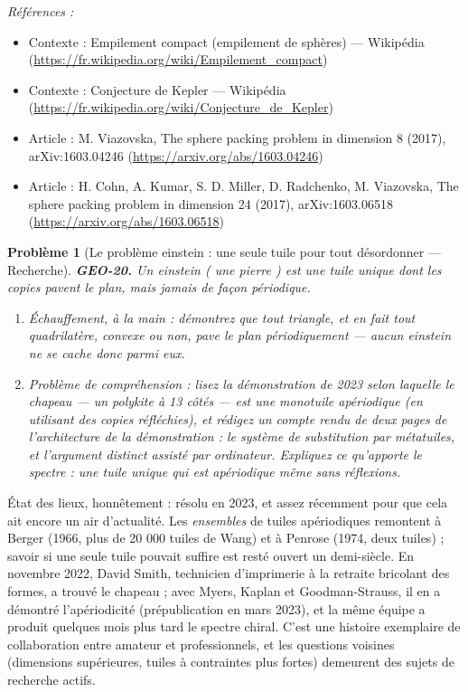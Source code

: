 \documentclass[11pt]{article}
\newtheorem{problem}{Problème}
\newenvironment{refs}{\par\small\noindent\emph{Références :}\begin{itemize}\setlength\itemsep{0pt}}{\end{itemize}\normalsize}
\begin{document}
\begin{refs}
\item Contexte : Empilement compact (empilement de sphères) --- Wikipédia (\url{https://fr.wikipedia.org/wiki/Empilement_compact})
\item Contexte : Conjecture de Kepler --- Wikipédia (\url{https://fr.wikipedia.org/wiki/Conjecture_de_Kepler})
\item Article : M. Viazovska, \og{} The sphere packing problem in dimension 8 \fg{} (2017), arXiv:1603.04246 (\url{https://arxiv.org/abs/1603.04246})
\item Article : H. Cohn, A. Kumar, S. D. Miller, D. Radchenko, M. Viazovska, \og{} The sphere packing problem in dimension 24 \fg{} (2017), arXiv:1603.06518 (\url{https://arxiv.org/abs/1603.06518})
\end{refs}

\bigskip

\begin{problem}[{Le problème einstein : une seule tuile pour tout désordonner --- Recherche}]
\textbf{GEO-20.} Un \textit{einstein} (\og{} une pierre \fg{}) est une tuile unique dont les copies pavent
le plan, mais jamais de façon périodique.
\begin{enumerate}
\item[(a)] Échauffement, à la main : démontrez que tout triangle, et en fait tout quadrilatère, convexe ou
non, pave le plan périodiquement --- aucun einstein ne se cache donc parmi eux.
\item[(b)] Problème de compréhension : lisez la démonstration de 2023 selon laquelle le \og{} chapeau \fg{} --- un
polykite à 13 côtés --- est une monotuile apériodique (en utilisant des copies réfléchies), et
rédigez un compte rendu de deux pages de l'architecture de la démonstration : le système de
substitution par métatuiles, et l'argument distinct assisté par ordinateur. Expliquez ce qu'apporte
le \og{} spectre \fg{} : une tuile unique qui est apériodique même sans réflexions.
\end{enumerate}

\end{problem}

\noindent État des lieux, honnêtement : résolu en 2023, et assez récemment pour que cela
ait encore un air d'actualité. Les \textit{ensembles} de tuiles apériodiques remontent à Berger (1966,
plus de 20 000 tuiles de Wang) et à Penrose (1974, deux tuiles) ; savoir si une seule tuile pouvait
suffire est resté ouvert un demi-siècle. En novembre 2022, David Smith, technicien d'imprimerie à
la retraite bricolant des formes, a trouvé le chapeau ; avec Myers, Kaplan et Goodman-Strauss, il
en a démontré l'apériodicité (prépublication en mars 2023), et la même équipe a produit quelques
mois plus tard le \og{} spectre \fg{} chiral. C'est une histoire exemplaire de collaboration entre amateur
et professionnels, et les questions voisines (dimensions supérieures, tuiles à contraintes plus
fortes) demeurent des sujets de recherche actifs.
\end{document}
